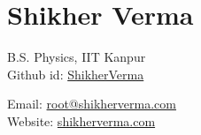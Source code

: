 \documentclass[a4paper]{article}
\author{Shikher Verma}
\begin{document}
\section*{\huge\textbf Shikher Verma}
\begin{minipage}{.45\linewidth}
	\begin{flushleft}
		B.S. Physics, IIT Kanpur\\
		Github id: \href{https://github.com/ShikherVerma}{ShikherVerma}\\
	\end{flushleft}
\end{minipage}
\hfill
\begin{minipage}{.45\linewidth}
	\begin{flushright}
		Email: \href{mailto:root@shikherverma.com}{root@shikherverma.com}\\
		Website: \href{http://shikherverma.com}{shikherverma.com}\\
	\end{flushright}
\end{minipage}

\end{document}
